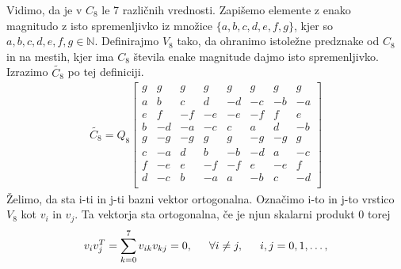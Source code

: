 \documentclass[a4paper,12pt,openright]{book}
\begin{document}
Vidimo, da je v $C_8$ le 7 različnih vrednosti. Zapišemo elemente z enako magnitudo z isto spremenljivko iz množice $\{a,b,c,d,e,f,g\}$, kjer so $a,b,c,d,e,f,g \in \mathbb{N}$. Definirajmo $V_8$ tako, da ohranimo istoležne predznake od $C_8$ in na mestih, kjer ima $C_8$ števila enake magnitude dajmo isto spremenljivko. Izrazimo $\widetilde{C_8}$ po tej definiciji.
\begin{gather}
   \widetilde{C_8} = Q_8
 \begin{bmatrix}
    g&  g&  g&  g&  g&  g&  g&  g\\
    a&  b&  c&  d& -d& -c& -b& -a\\
    e&  f& -f& -e& -e& -f&  f&  e\\
    b& -d& -a& -c&  c&  a&  d& -b\\
    g& -g& -g&  g&  g& -g& -g&  g\\
    c& -a&  d&  b& -b& -d&  a& -c\\
    f& -e&  e& -f& -f&  e& -e&  f\\
    d& -c&  b& -a&  a& -b&  c& -d\\
 \end{bmatrix}
\label{eq:IntegerDCT_Q8}
\end{gather}
Želimo, da sta i-ti in j-ti bazni vektor ortogonalna. Označimo i-to in j-to vrstico $V_8$ kot $v_i$ in $v_j$. Ta vektorja sta ortogonalna, če je njun skalarni produkt 0 torej
\begin{equation*}
    v_i v_j^T = \sum_{k=0}^7v_{ik}v_{kj} = 0,\indent \forall i \neq j, \indent i,j = 0,1,\ldots,
\end{equation*}
\end{document}
